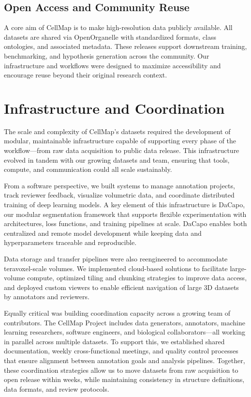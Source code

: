 \documentclass[times, twoside]{zHenriquesLab-StyleBioRxiv}
\begin{document}
\subsection{Open Access and Community Reuse}
A core aim of CellMap is to make high-resolution data publicly available. All datasets are shared via OpenOrganelle with standardized formats, class ontologies, and associated metadata. These releases support downstream training, benchmarking, and hypothesis generation across the community. Our infrastructure and workflows were designed to maximize accessibility and encourage reuse beyond their original research context.

\section*{Infrastructure and Coordination}
The scale and complexity of CellMap’s datasets required the development of modular, maintainable infrastructure capable of supporting every phase of the workflow—from raw data acquisition to public data release. This infrastructure evolved in tandem with our growing datasets and team, ensuring that tools, compute, and communication could all scale sustainably.

From a software perspective, we built systems to manage annotation projects, track reviewer feedback, visualize volumetric data, and coordinate distributed training of deep learning models. A key element of this infrastructure is DaCapo, our modular segmentation framework that supports flexible experimentation with architectures, loss functions, and training pipelines at scale. DaCapo enables both centralized and remote model development while keeping data and hyperparameters traceable and reproducible.

Data storage and transfer pipelines were also reengineered to accommodate teravoxel-scale volumes. We implemented cloud-based solutions to facilitate large-volume compute, optimized tiling and chunking strategies to improve data access, and deployed custom viewers to enable efficient navigation of large 3D datasets by annotators and reviewers.

Equally critical was building coordination capacity across a growing team of contributors. The CellMap Project includes data generators, annotators, machine learning researchers, software engineers, and biological collaborators—all working in parallel across multiple datasets. To support this, we established shared documentation, weekly cross-functional meetings, and quality control processes that ensure alignment between annotation goals and analysis pipelines. Together, these coordination strategies allow us to move datasets from raw acquisition to open release within weeks, while maintaining consistency in structure definitions, data formats, and review protocols.
\end{document}
